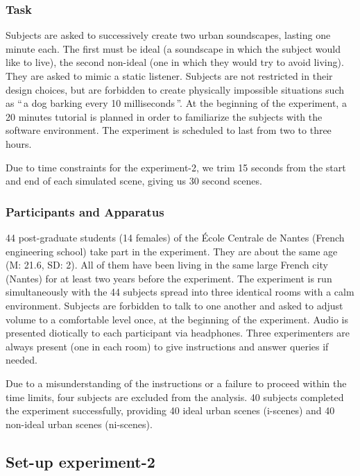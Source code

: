 \documentclass[twoside,twocolumn]{article}
\begin{document}
\subsubsection*{Task}

Subjects are asked to successively create two urban soundscapes, lasting one minute each. The first must be ideal (a soundscape in which the subject would like to live), the second non-ideal (one in which they would try to avoid living). They are asked to mimic a static listener. Subjects are not restricted in their design choices, but are forbidden to create physically impossible situations such as ``\,a dog barking every 10 milliseconds\,''. At the beginning of the experiment, a 20 minutes tutorial is planned in order to familiarize the subjects with the software environment. The experiment is scheduled to last from two to three hours.

Due to time constraints for the experiment-2, we trim 15 seconds from the start and end of each simulated scene, giving us 30 second scenes.

\subsubsection*{Participants and Apparatus}

44 post-graduate students (14 females) of the {\'E}cole Centrale de Nantes (French engineering school) take part in the experiment. They are about the same age (M: 21.6, SD: 2). All of them have been living in the same large French city (Nantes) for at least two years before the experiment. The experiment is run simultaneously with the 44 subjects spread into three identical rooms with a calm environment. Subjects are forbidden to talk to one another and asked to adjust volume to a comfortable level once, at the beginning of the experiment. Audio is presented diotically to each participant via headphones. Three experimenters are always present (one in each room) to give instructions and answer queries if needed.

Due to a misunderstanding of the instructions or a failure to proceed within the time limits, four subjects are excluded from the analysis. 40 subjects completed the experiment successfully, providing 40 ideal urban scenes (i-scenes) and 40 non-ideal urban scenes (ni-scenes). 

\subsection{Set-up experiment-2}
\label{sec:Experiment-2}
\end{document}
